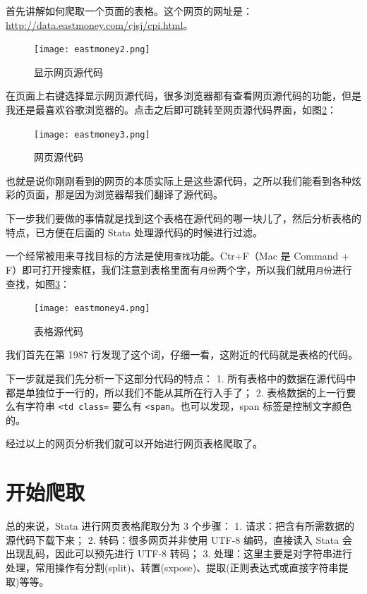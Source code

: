 \documentclass[cn,fancy,blue,11pt]{elegantbook}
\begin{document}
首先讲解如何爬取一个页面的表格。这个网页的网址是：\url{http://data.eastmoney.com/cjsj/cpi.html}。

\begin{figure}
  \centering
  \texttt{[image: eastmoney2.png]}
  \caption{显示网页源代码}
  \label{fig:eastmoney2}
\end{figure}

在页面上右键选择显示网页源代码，很多浏览器都有查看网页源代码的功能，但是我还是最喜欢谷歌浏览器的。点击之后即可跳转至网页源代码界面，如图\ref{fig:eastmoney3}：

\begin{figure}
  \centering
  \texttt{[image: eastmoney3.png]}
  \caption{网页源代码}
  \label{fig:eastmoney3}
\end{figure}

也就是说你刚刚看到的网页的本质实际上是这些源代码，之所以我们能看到各种炫彩的页面，那是因为浏览器帮我们翻译了源代码。

下一步我们要做的事情就是找到这个表格在源代码的哪一块儿了，然后分析表格的特点，已方便在后面的 Stata 处理源代码的时候进行过滤。

一个经常被用来寻找目标的方法是使用\lstinline{查找}功能。Ctr+F（Mac 是 Command + F）即可打开搜索框，我们注意到表格里面有\lstinline{月份}两个字，所以我们就用\lstinline{月份}进行查找，如图\ref{fig:eastmoney4}：

\begin{figure}
  \centering
  \texttt{[image: eastmoney4.png]}
  \caption{表格源代码}
  \label{fig:eastmoney4}
\end{figure}

我们首先在第 1987 行发现了这个词，仔细一看，这附近的代码就是表格的代码。

下一步就是我们先分析一下这部分代码的特点：
1. 所有表格中的数据在源代码中都是单独位于一行的，所以我们不能从其所在行入手了；
2. 表格数据的上一行要么有字符串 \lstinline{<td class=} 要么有 \lstinline{<span}。也可以发现，span 标签是控制文字颜色的。

经过以上的网页分析我们就可以开始进行网页表格爬取了。

\hypertarget{section-31}{%
\section{开始爬取}\label{section-31}}

总的来说，Stata 进行网页表格爬取分为 3 个步骤：
1. 请求：把含有所需数据的源代码下载下来；
2. 转码：很多网页并非使用 UTF-8 编码，直接读入 Stata 会出现乱码，因此可以预先进行 UTF-8 转码；
3. 处理：这里主要是对字符串进行处理，常用操作有分割(split)、转置(sxpose)、提取(正则表达式或直接字符串提取)等等。
\end{document}
